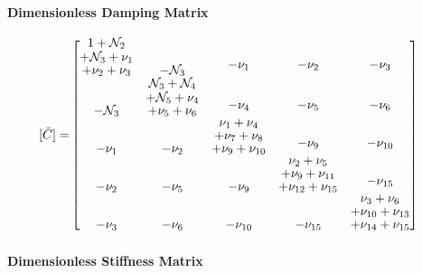 \documentclass[12pt,a4paper]{article}
\begin{document}
\paragraph{Dimensionless Damping Matrix}

\begin{equation}\label{Eq.damping_matrix_dimensionless}
\begin{aligned}
[\bar{C}] =& 
\begin{bmatrix}
\shortstack{$1 + \mathcal{N}_2$ \\ $+ \mathcal{N}_3 + \nu_1$ \\ $+ \nu_2 + \nu_3$} & -\mathcal{N}_3 & \shortstack{$-\nu_1$ \\ \,} & \shortstack{$-\nu_2$ \\ \,} & \shortstack{$-\nu_3$ \\ \,} \\
-\mathcal{N}_3 & \shortstack{$\mathcal{N}_3 + \mathcal{N}_4$ \\ $+ \mathcal{N}_5 + \nu_4$ \\ $+ \nu_5 + \nu_6$} & \shortstack{$-\nu_4$ \\ \,} & \shortstack{$-\nu_5$ \\ \,} & \shortstack{$-\nu_6$ \\ \,} \\
-\nu_1 & -\nu_2 & \shortstack{$\nu_1 + \nu_4$ \\ $+ \nu_7 + \nu_8$ \\ $+ \nu_9 + \nu_{10}$} & \shortstack{$-\nu_9$ \\ \,} & \shortstack{$-\nu_{10}$ \\ \,} \\
-\nu_2 & -\nu_5 & -\nu_9 & \shortstack{$\nu_2 + \nu_5$ \\ $+ \nu_9 + \nu_{11}$ \\ $+ \nu_{12} + \nu_{15}$} & \shortstack{$-\nu_{15}$ \\ \,} \\
-\nu_3 & -\nu_{6} & -\nu_{10} & -\nu_{15} & \shortstack{$\nu_3 + \nu_6$ \\ $+ \nu_{10} + \nu_{13}$ \\ $+ \nu_{14} + \nu_{15}$}
\end{bmatrix}
\end{aligned}
\end{equation}

\paragraph{Dimensionless Stiffness Matrix}
\end{document}
